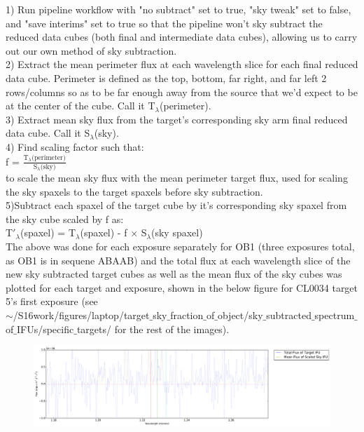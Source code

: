\documentclass[10pt,letterpaper]{article}
\begin{document}
1) Run pipeline workflow with "no subtract" set to true, "sky tweak" set to false, and "save interims" set to true so that the pipeline won't sky subtract the reduced data cubes (both final and intermediate data cubes), allowing us to carry out our own method of sky subtraction.\\

2) Extract the mean perimeter flux at each wavelength slice for each final reduced data cube. Perimeter is defined as the top, bottom, far right, and far left 2 rows/columns so as to be far enough away from the source that we'd expect to be at the center of the cube. Call it T$_{\lambda}$(perimeter).\\

3) Extract mean sky flux from the target's corresponding sky arm final reduced data cube. Call it S$_{\lambda}$(sky).\\

4) Find scaling factor such that:\\
f = $\frac{\text{T}_{\lambda}\text{(perimeter)}}{\text{S}_{\lambda}\text{(sky)}}$\\
to scale the mean sky flux with the mean perimeter target flux, used for scaling the sky spaxels to the target spaxels before sky subtraction.\\

5)Subtract each spaxel of the target cube by it's corresponding sky spaxel from the sky cube scaled by f as:\\
T$\prime _{\lambda}$(spaxel) = T$_{\lambda}$(spaxel) - f $\times$ S$_{\lambda}$(sky spaxel)\\

The above was done for each exposure separately for OB1 (three exposures total, as OB1 is in sequene ABAAB) and the total flux at each wavelength slice of the new sky subtracted target cubes as well as the mean flux of the sky cubes was plotted for each target and exposure, shown in the below figure for CL0034 target 5's first exposure (see \\$\sim$/S16work/figures/laptop/target$\_$sky$\_$fraction$\_$of$\_$object/sky$\_$subtracted$\_$spectrum$\_$of$\_$IFUs/specific$\_$targets/ for the rest of the images).\\

\begin{figure}[h!]
\includegraphics[scale=0.4]{figures/CL0034-YJ-OB-1_2014-07-11Tfirst_exposure_Target_5.pdf}
\end{figure}
\end{document}
